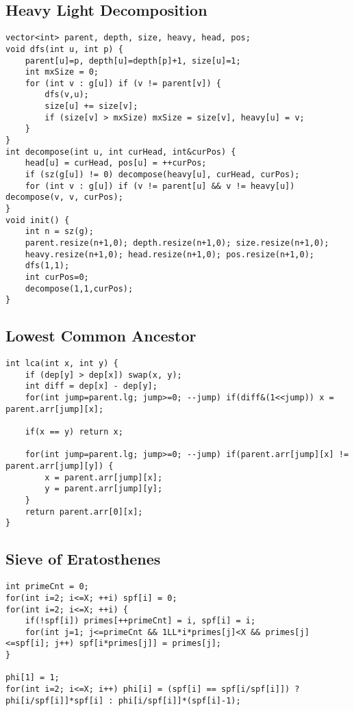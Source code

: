 \documentclass[12pt,a4paper,onesided]{article}
\begin{document}
\begin{multicols}{3}
\subsection{Heavy Light Decomposition}
\begin{lstlisting}
vector<int> parent, depth, size, heavy, head, pos;
void dfs(int u, int p) {
    parent[u]=p, depth[u]=depth[p]+1, size[u]=1;
    int mxSize = 0;
    for (int v : g[u]) if (v != parent[v]) {
        dfs(v,u);
        size[u] += size[v];
        if (size[v] > mxSize) mxSize = size[v], heavy[u] = v;
    }
}
int decompose(int u, int curHead, int&curPos) {
    head[u] = curHead, pos[u] = ++curPos;
    if (sz(g[u]) != 0) decompose(heavy[u], curHead, curPos);
    for (int v : g[u]) if (v != parent[u] && v != heavy[u]) decompose(v, v, curPos);
}
void init() {
    int n = sz(g);
    parent.resize(n+1,0); depth.resize(n+1,0); size.resize(n+1,0);
    heavy.resize(n+1,0); head.resize(n+1,0); pos.resize(n+1,0);
    dfs(1,1);
    int curPos=0;
    decompose(1,1,curPos);
}
\end{lstlisting}



\subsection{Lowest Common Ancestor}
\begin{lstlisting}
int lca(int x, int y) {
    if (dep[y] > dep[x]) swap(x, y);
    int diff = dep[x] - dep[y];
    for(int jump=parent.lg; jump>=0; --jump) if(diff&(1<<jump)) x = parent.arr[jump][x];
      
	if(x == y) return x;
      
	for(int jump=parent.lg; jump>=0; --jump) if(parent.arr[jump][x] != parent.arr[jump][y]) {
        x = parent.arr[jump][x]; 
	    y = parent.arr[jump][y];
    }
    return parent.arr[0][x];
}
\end{lstlisting}



\subsection{Sieve of Eratosthenes}
\begin{lstlisting}
int primeCnt = 0;
for(int i=2; i<=X; ++i) spf[i] = 0;
for(int i=2; i<=X; ++i) {
    if(!spf[i]) primes[++primeCnt] = i, spf[i] = i;
    for(int j=1; j<=primeCnt && 1LL*i*primes[j]<X && primes[j]<=spf[i]; j++) spf[i*primes[j]] = primes[j];
}

phi[1] = 1;
for(int i=2; i<=X; i++) phi[i] = (spf[i] == spf[i/spf[i]]) ? phi[i/spf[i]]*spf[i] : phi[i/spf[i]]*(spf[i]-1);
\end{lstlisting}



\end{multicols}
\end{document}
